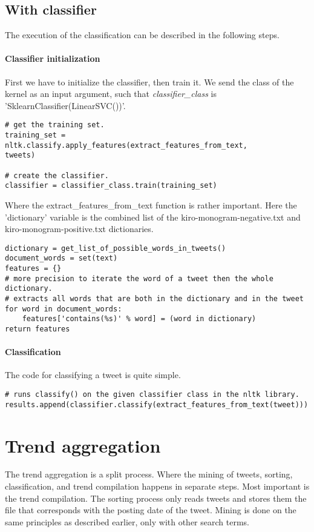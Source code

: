 \subsection{With classifier}
The execution of the classification can be described in the following steps. 

\paragraph{Classifier initialization}
First we have to initialize the classifier, then train it. We send the class of
the kernel as an input argument, such that \textit{classifier\_class} is
'SklearnClassifier(LinearSVC())'.
\begin{verbatim}
# get the training set.
training_set = nltk.classify.apply_features(extract_features_from_text,
tweets)

# create the classifier.
classifier = classifier_class.train(training_set)
\end{verbatim}

Where the extract\_features\_from\_text function is rather important. Here the
'dictionary' variable is the combined list of the kiro-monogram-negative.txt and
kiro-monogram-positive.txt dictionaries.
\begin{verbatim}
dictionary = get_list_of_possible_words_in_tweets()
document_words = set(text)
features = {}
# more precision to iterate the word of a tweet then the whole dictionary.
# extracts all words that are both in the dictionary and in the tweet
for word in document_words:
    features['contains(%s)' % word] = (word in dictionary)
return features
\end{verbatim}

\paragraph{Classification}
The code for classifying a tweet is quite simple. 
\begin{verbatim}
# runs classify() on the given classifier class in the nltk library.
results.append(classifier.classify(extract_features_from_text(tweet)))
\end{verbatim}

\section{Trend aggregation}\label{code:trend_aggregation}
The trend aggregation is a split process. Where the mining of tweets, sorting,
classification, and trend compilation happens in separate steps. Most important
is the trend compilation. The sorting process only reads tweets
and stores them the file that corresponds with the posting date of the tweet.
Mining is done on the same principles as described earlier, only with other
search terms. 


